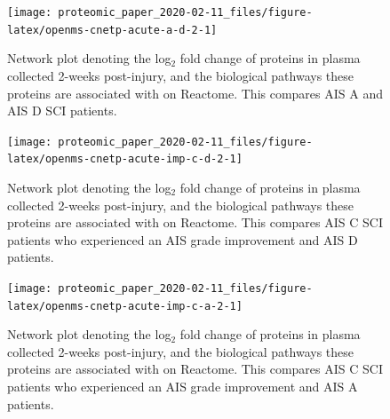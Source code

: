 \documentclass[9pt,lineno]{elife}
\begin{document}
\begin{landscape}



\begin{figure}

{\centering \texttt{[image: proteomic\_paper\_2020-02-11\_files/figure-latex/openms-cnetp-acute-a-d-2-1]} 

}

\caption[Network plot - iTRAQ - Acute A VS Acute D]{Network plot denoting the log\(_2\) fold change of proteins in plasma collected 2-weeks post-injury, and the biological pathways these proteins are associated with on Reactome. This compares AIS A and AIS D SCI patients.}\label{fig:openms-cnetp-acute-a-d-2}
\end{figure}

\end{landscape}
\begin{landscape}



\begin{figure}

{\centering \texttt{[image: proteomic\_paper\_2020-02-11\_files/figure-latex/openms-cnetp-acute-imp-c-d-2-1]} 

}

\caption[Network plot - iTRAQ - Acute C Improvers VS Acute D]{Network plot denoting the log\(_2\) fold change of proteins in plasma collected 2-weeks post-injury, and the biological pathways these proteins are associated with on Reactome. This compares AIS C SCI patients who experienced an AIS grade improvement and AIS D patients.}\label{fig:openms-cnetp-acute-imp-c-d-2}
\end{figure}

\end{landscape}
\begin{landscape}



\begin{figure}

{\centering \texttt{[image: proteomic\_paper\_2020-02-11\_files/figure-latex/openms-cnetp-acute-imp-c-a-2-1]} 

}

\caption[Network plot - iTRAQ - Acute C Improvers VS Acute A]{Network plot denoting the log\(_2\) fold change of proteins in plasma collected 2-weeks post-injury, and the biological pathways these proteins are associated with on Reactome. This compares AIS C SCI patients who experienced an AIS grade improvement and AIS A patients.}\label{fig:openms-cnetp-acute-imp-c-a-2}
\end{figure}

\end{landscape}
\end{document}
